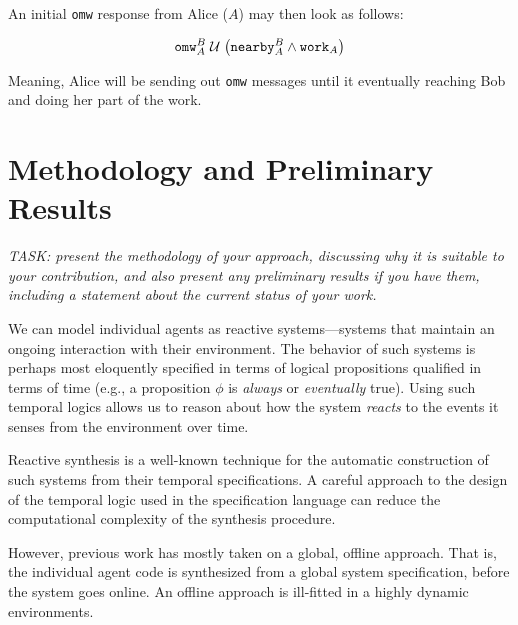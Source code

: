 \documentclass[conference]{IEEEtran}
\begin{document}
An initial \texttt{omw} response from Alice ($A$) may then look as
follows:

\begin{align}
\mathtt{omw}^B_A \until %
  \p{\mathtt{nearby}_A^B \wedge \mathtt{work}_A}%
\end{align}

Meaning, Alice will be sending out \texttt{omw} messages until it
eventually reaching Bob and doing her part of the work.



\section{Methodology and Preliminary Results}

\emph{TASK: present the methodology of your approach, discussing why
it is suitable to your contribution, and also present any preliminary
results if you have them, including a statement about the current
status of your work.}

We can model individual agents as reactive systems---systems that
maintain an ongoing interaction with their
environment\cite{1985-Reactive-Systems}. The behavior of such systems
is perhaps most eloquently specified in terms of logical propositions
qualified in terms of time (e.g., a proposition $\phi$ is
\emph{always} or \emph{eventually} true). Using such temporal logics
allows us to reason about how the system \emph{reacts} to the events
it senses from the environment over time.

Reactive synthesis is a well-known technique for the automatic
construction of such systems from their temporal
specifications\cite{1989-POPL-Pnueli-Rosner}. A careful approach to
the design of the temporal logic used in the specification language
can reduce the computational complexity of the synthesis
procedure\cite{2006-Synthesis-of-Reactive-1-Designs,2021-Spectra}.

However, previous work has mostly taken on a global, offline approach.
That is, the individual agent code is synthesized from a global system
specification, before the system goes online. An offline approach is
ill-fitted in a highly dynamic environments\cite{2022-Live-Synthesis}.
\end{document}
